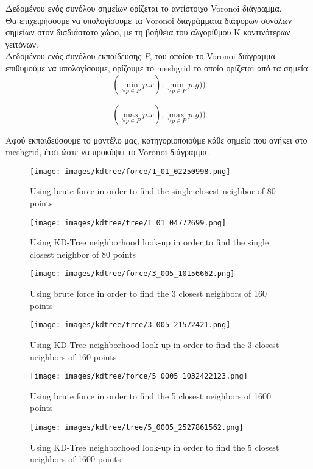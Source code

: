 \documentclass[12pt]{article}
\newenvironment{matlab}
	{\begin{figure}[H]\centering\captionsetup{justification=centering}}
	{\end{figure}}
\begin{document}
Δεδομένου ενός συνόλου σημείων ορίζεται το αντίστοιχο Voronoi διάγραμμα. \\

Θα επιχειρήσουμε να υπολογίσουμε τα Voronoi διαγράμματα διάφορων συνόλων σημείων στον δισδιάστατο χώρο,
με τη βοήθεια του αλγορίθμου K κοντινότερων γειτόνων. \\

Δεδομένου ενός συνόλου εκπαίδευσης \( P \), του οποίου το Voronoi διάγραμμα επιθυμούμε
να υπολογίσουμε, ορίζουμε το meshgrid το οποίο ορίζεται από τα σημεία \\

\[ (\min_{\forall p \in P} p.x), \min_{\forall p \in P} p.y)) \]

\[ (\max_{\forall p \in P} p.x), \max_{\forall p \in P} p.y)) \]

Αφού εκπαιδεύσουμε το μοντέλο μας, κατηγοριοποιούμε κάθε σημείο που ανήκει
στο meshgrid, έτσι ώστε να προκύψει το Voronoi διάγραμμα. \\

\begin{matlab}
    \texttt{[image: images/kdtree/force/1\_01\_02250998.png]}
    \caption{Using brute force in order to find the single closest neighbor of 80 points}
\end{matlab}

\begin{matlab}
    \texttt{[image: images/kdtree/tree/1\_01\_04772699.png]}
    \caption{Using KD-Tree neighborhood look-up in order to find the single closest neighbor of 80 points}
\end{matlab}

\begin{matlab}
    \texttt{[image: images/kdtree/force/3\_005\_10156662.png]}
    \caption{Using brute force in order to find the 3 closest neighbors of 160 points}
\end{matlab}

\begin{matlab}
    \texttt{[image: images/kdtree/tree/3\_005\_21572421.png]}
    \caption{Using KD-Tree neighborhood look-up in order to find the 3 closest neighbors of 160 points}
\end{matlab}

\begin{matlab}
    \texttt{[image: images/kdtree/force/5\_0005\_1032422123.png]}
    \caption{Using brute force in order to find the 5 closest neighbors of 1600 points}
\end{matlab}

\begin{matlab}
    \texttt{[image: images/kdtree/tree/5\_0005\_2527861562.png]}
    \caption{Using KD-Tree neighborhood look-up in order to find the 5 closest neighbors of 1600 points}
\end{matlab}
\end{document}
